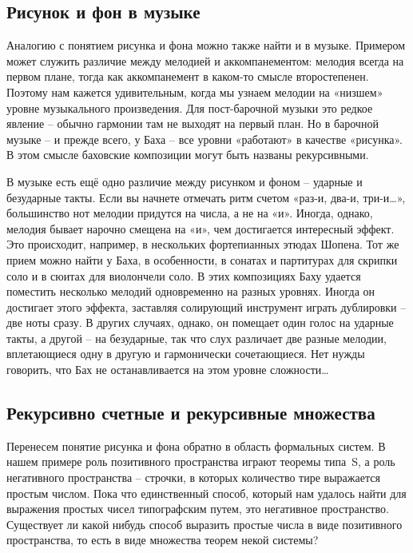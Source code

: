 \documentclass[../main.tex]{subfiles}
\begin{document}
\subsection{Рисунок и фон в музыке}

Аналогию с понятием рисунка и фона можно также найти и в музыке.
Примером может служить различие между мелодией и аккомпанементом: мелодия всегда на первом плане, тогда как аккомпанемент в каком-то смысле второстепенен.
Поэтому нам кажется удивительным, когда мы узнаем мелодии на «низшем» уровне музыкального произведения.
Для пост-барочной музыки это редкое явление \--- обычно гармонии там не выходят на первый план.
Но в барочной музыке \--- и прежде всего, у Баха \--- все уровни «работают» в качестве «рисунка».
В этом смысле баховские композиции могут быть названы рекурсивными.

В музыке есть ещё одно различие между рисунком и фоном \--- ударные и безударные такты.
Если вы начнете отмечать ритм счетом «раз-и, два-и, три-и\ldots», большинство нот мелодии придутся на числа, а не на «и».
Иногда, однако, мелодия бывает нарочно смещена на «и», чем достигается интересный эффект.
Это происходит, например, в нескольких фортепианных этюдах Шопена.
Тот же прием можно найти у Баха, в особенности, в сонатах и партитурах для скрипки соло и в сюитах для виолончели соло.
В этих композициях Баху удается поместить несколько мелодий одновременно на разных уровнях.
Иногда он достигает этого эффекта, заставляя солирующий инструмент играть дублировки \--- две ноты сразу.
В других случаях, однако, он помещает один голос на ударные такты, а другой \--- на безударные, так что слух различает две разные мелодии, вплетающиеся одну в другую и гармонически сочетающиеся.
Нет нужды говорить, что Бах не останавливается на этом уровне сложности\ldots{}


\subsection{Рекурсивно счетные и рекурсивные множества}

Перенесем понятие рисунка и фона обратно в область формальных систем.
В нашем примере роль позитивного пространства играют теоремы типа~S, а роль негативного пространства \--- строчки, в которых количество тире выражается простым числом.
Пока что единственный способ, который нам удалось найти для выражения простых чисел типографским путем, это негативное пространство.
Существует ли какой нибудь способ выразить простые числа в виде позитивного пространства, то есть в виде множества теорем некой системы?
\end{document}
